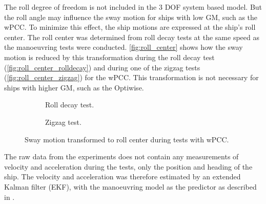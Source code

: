 The roll degree of freedom is not included in the 3 DOF system based model. But the roll angle may influence the sway motion for ships with low GM, such as the wPCC. To minimize this effect, the ship motions are expressed at the ship's roll center. The roll center was determined from roll decay tests at the same speed as the manoeuvring tests were conducted. \autoref{fig:roll_center} shows how the sway motion is reduced by this transformation during the roll decay test (\autoref{fig:roll_center_rolldecay}) and during one of the zigzag tests (\autoref{fig:roll_center_zigzag}) for the wPCC. This transformation is not necessary for ships with higher GM, such as the Optiwise.
\begin{figure}[h]
     \centering
     \begin{subfigure}[b]{0.49\textwidth}
         \centering
         
        \caption{Roll decay test.}
        \label{fig:roll_center_rolldecay}
     \end{subfigure}
     \hfill
     \begin{subfigure}[b]{0.49\textwidth}
        \centering
        
        \caption{Zigzag test.}
        \label{fig:roll_center_zigzag}
     \end{subfigure}
        \caption{Sway motion transformed to roll center during tests with wPCC.}
        \label{fig:roll_center}
\end{figure}

The raw data from the experiments does not contain any measurements of velocity and acceleration during the tests, only the position and heading of the ship. The velocity and acceleration was therefore estimated by an extended Kalman filter (EKF), with the manoeuvring model as the predictor as described in \citet{alexanderssonSystemIdentificationVessel2022}.